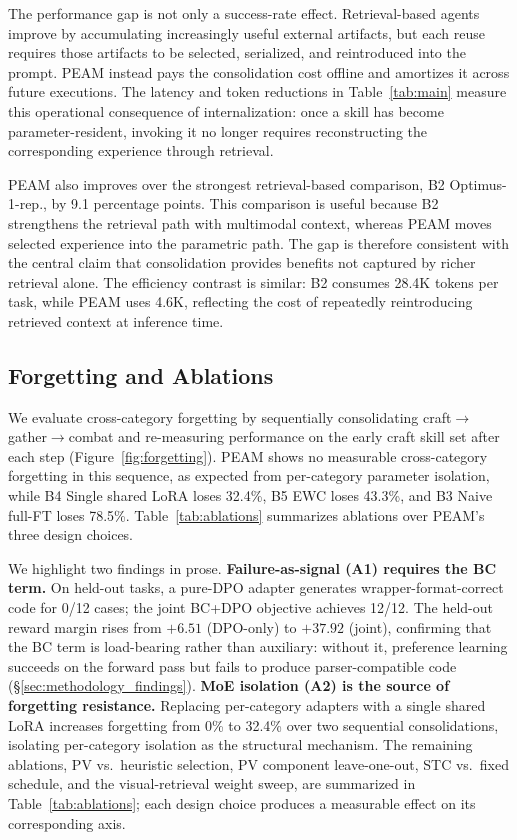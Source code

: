 \documentclass[11pt]{article}
\begin{document}
The performance gap is not only a success-rate effect. Retrieval-based agents improve by accumulating increasingly useful external artifacts, but each reuse requires those artifacts to be selected, serialized, and reintroduced into the prompt. PEAM instead pays the consolidation cost offline and amortizes it across future executions. The latency and token reductions in Table~\ref{tab:main} measure this operational consequence of internalization: once a skill has become parameter-resident, invoking it no longer requires reconstructing the corresponding experience through retrieval.

PEAM also improves over the strongest retrieval-based comparison, B2 Optimus-1-rep., by 9.1 percentage points. This comparison is useful because B2 strengthens the retrieval path with multimodal context, whereas PEAM moves selected experience into the parametric path. The gap is therefore consistent with the central claim that consolidation provides benefits not captured by richer retrieval alone. The efficiency contrast is similar: B2 consumes 28.4K tokens per task, while PEAM uses 4.6K, reflecting the cost of repeatedly reintroducing retrieved context at inference time.


\subsection{Forgetting and Ablations}
\label{sec:exp_ablations}
We evaluate cross-category forgetting by sequentially consolidating craft$\rightarrow$gather$\rightarrow$combat and re-measuring performance on the early craft skill set after each step (Figure~\ref{fig:forgetting}). PEAM shows no measurable cross-category forgetting in this sequence, as expected from per-category parameter isolation, while B4 Single shared LoRA loses 32.4\%, B5 EWC loses 43.3\%, and B3 Naive full-FT loses 78.5\%. Table~\ref{tab:ablations} summarizes ablations over PEAM's three design choices.

We highlight two findings in prose. \textbf{Failure-as-signal (A1) requires the BC term.} On held-out tasks, a pure-DPO adapter generates wrapper-format-correct code for 0/12 cases; the joint BC+DPO objective achieves 12/12. The held-out reward margin rises from $+6.51$ (DPO-only) to $+37.92$ (joint), confirming that the BC term is load-bearing rather than auxiliary: without it, preference learning succeeds on the forward pass but fails to produce parser-compatible code (\S\ref{sec:methodology_findings}). \textbf{MoE isolation (A2) is the source of forgetting resistance.} Replacing per-category adapters with a single shared LoRA increases forgetting from 0\% to 32.4\% over two sequential consolidations, isolating per-category isolation as the structural mechanism. The remaining ablations, PV vs.\ heuristic selection, PV component leave-one-out, STC vs.\ fixed schedule, and the visual-retrieval weight sweep, are summarized in Table~\ref{tab:ablations}; each design choice produces a measurable effect on its corresponding axis.
\end{document}
